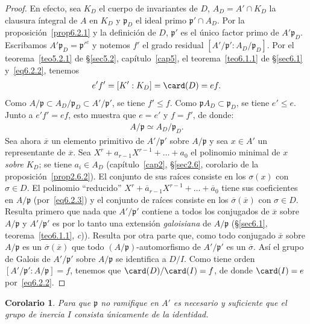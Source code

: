\documentclass[oneside,bibtotoc,leqno,spanish]{amsbook}
\newcommand{\idl}[1]{\mathfrak{#1}}
\newcommand{\QED}{}%
\newcommand{\oline}[1]{\overline{#1}}
\numberwithin{equation}{section}
\theoremstyle{defi}
\theoremstyle{note}
\newtheorem*{corollary*}{Corolario}
\theoremstyle{rem}
\numberwithin{theorem}{section}
\numberwithin{proposition}{section}
\numberwithin{definition}{section}
\numberwithin{lemma}{section}
\numberwithin{corollary}{section}
\numberwithin{example}{section}
\numberwithin{footnote}{section}%
\begin{document}
\begin{proof}
En efecto, sea $K_{D}$ el cuerpo de invariantes de $D$, $A_{D} = A'\cap K_{D}$ la clausura \'integral de
$A$ en $K_{D}$ y $\idl{p}_{D}$ el ideal primo $\idl{p}'\cap A_{D}$. Por la
proposici\'on~\ref{prop6.2.1} y la definici\'on
de $D$, $\idl{p}'$ es el \'unico factor primo de $A'\idl{p}_{D}$. Escribamos $A'\idl{p}_{D} = \idl{p}'^{e}$
y notemos $f'$ el grado residual $[A'/\idl{p}':A_{D}/\idl{p}_{D}]$. Por el teorema~\ref{teo5.2.1} de \S\ref{sec5.2},
cap\'itulo~\ref{cap5},
el teorema~\ref{teo6.1.1} de \S\ref{sec6.1} y~\eqref{eq6.2.2}, tenemos
\begin{gather*}
e'f'=[K':K_{D}]=\card(D)=ef.
\end{gather*}
Como $A/\idl{p}\subset A_{D}/\idl{p}_{D}\subset A'/\idl{p}'$, se tiene $f'\leq f$. Como $\idl{p}A_{D}\subset\idl{p}_{D}$,
se tiene $e'\leq e$. Junto a $e'f'=ef$, esto muestra que $e=e'$ y $f=f'$, de donde:
\begin{gather}\label{eq6.2.3}
A/\idl{p}\simeq A_{D}/\idl{p}_{D}.
\end{gather}
Sea ahora $\oline x$ un elemento primitivo de $A'/\idl{p}'$ sobre $A/\idl{p}$ y sea $x\in A'$ un
representante de $\oline x$. Sea $X^{r}+a_{r-1}X^{r-1}+\dots+a_{0}$ el polinomio minimal de $x$
{\em sobre} $K_{D}$; se tiene $a_{i}\in A_{D}$ (cap\'itulo~\ref{cap2}, \S\ref{sec2.6},
corolario de la proposici\'on~\ref{prop2.6.2}).
El conjunto de sus ra\'ices consiste en los $\sigma(x)$ con $\sigma\in D$. El polinomio
``reducido'' $X^{r}+\oline a_{r-1}X^{r-1}+\dots+\oline a_{0}$ tiene sus coeficientes en $A/\idl{p}$
(por~\eqref{eq6.2.3}) y el conjunto de ra\'ices consiste en los $\oline\sigma(\oline x)$ con $\sigma\in D$. Resulta
primero que nada que $A'/\idl{p}'$ contiene a todos los conjugados de $\oline x$ sobre $A/\idl{p}$ y
$A'/\idl{p}'$ es por lo tanto una extensi\'on {\em galoisiana} de $A/\idl{p}$
(\S\ref{sec6.1}, teorema~\ref{teo6.1.1}, {\itshape c})). Resulta por otra parte que, como todo conjugado $\oline x$ sobre $A/\idl{p}$
es un $\oline\sigma(\oline x)$ que todo $(A/\idl{p})$-automorfismo de $A'/\idl{p}'$ es un $\oline\sigma$.
As\'i el grupo de Galois de $A'/\idl{p}'$ sobre $A/\idl{p}$ se identifica a $D/I$. Como tiene orden
$[A'/\idl{p}':A/\idl{p}]=f$, tenemos que $\card(D)/\card(I) = f$, de donde $\card(I) = e$ por~\eqref{eq6.2.2}. \QED
\end{proof}

\begin{corollary*}
Para que $\idl{p}$ no ramifique en $A'$ es necesario y suficiente que el grupo de inercia $I$ consista
\'unicamente de la identidad.
\end{corollary*}
\end{document}
